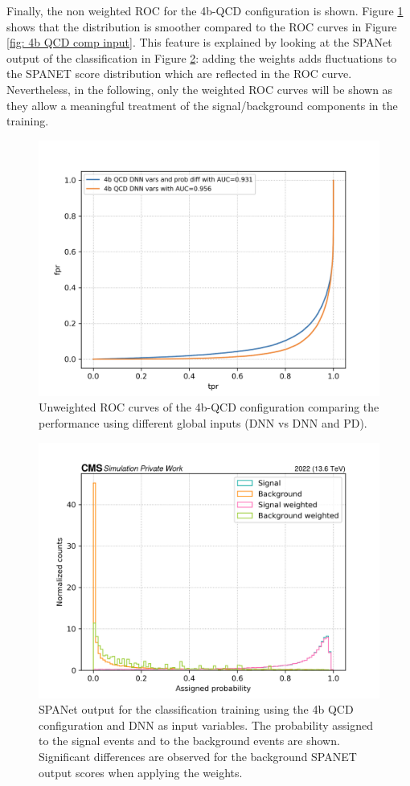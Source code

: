 Finally, the non weighted ROC for the 4b-QCD configuration is shown. Figure \ref{fig: 4b QCD ROC no weights} shows that the distribution is smoother compared to the ROC curves in Figure \ref{fig: 4b QCD comp input}. This feature is explained by looking at the SPANet output of the classification in Figure \ref{fig: SPANet output S/B 4b QCD}: adding the weights adds fluctuations to the SPANET score distribution which are reflected in the ROC curve. Nevertheless, in the following, only the weighted ROC curves will be shown as they allow a meaningful treatment of the signal/background components in the training.

\begin{figure}[hbt]
    \centering
    \includegraphics[width=0.7\linewidth]{Images/7.S_B/Inputs/no weights 4b QCD.png}
    \caption{Unweighted ROC curves of the 4b-QCD configuration comparing the performance using different global inputs (DNN vs DNN and PD).}
    \label{fig: 4b QCD ROC no weights}
\end{figure}

\begin{figure}
    \centering
    \includegraphics[width=0.7\linewidth]{Images/7.S:B/Classification outputs/4b QCD dnn.png}
    \caption{SPANet output for the classification training using the 4b QCD configuration and DNN as input variables. The probability assigned to the signal events and to the background events are shown. Significant differences are observed for the background SPANET output scores when applying the weights.}
    \label{fig: SPANet output S/B 4b QCD}
\end{figure}

